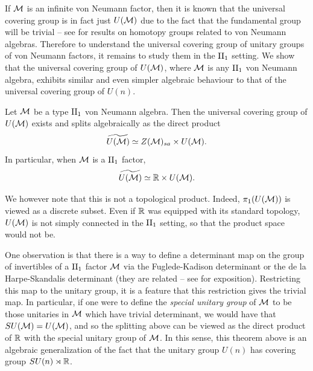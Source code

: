 \documentclass{amsart}
\begin{document}
  If $\mathcal{M}$ is an infinite von Neumann factor, then it is known that the universal covering group is in fact just $U(\mathcal{M})$ due to the fact that the fundamental group will be trivial -- see \cite{Kuiper65,Breuer70,ArakiSmithSmith71,BruningWillgerodt76,Handelman78,Schroder84,Schroder84real} for results on homotopy groups related to von Neumann algebras.
  Therefore to understand the universal covering group of unitary groups of von Neumann factors, it remains to study them in the $\text{II}_1$ setting.
  We show that the universal covering group of $U(\mathcal{M})$, where $\mathcal{M}$ is any $\text{II}_1$ von Neumann algebra, exhibits similar and even simpler algebraic behaviour to that of the universal covering group of $U(n)$.
  

\begin{result}
Let $\mathcal{M}$ be a type $\text{II}_1$ von Neumann algebra. Then the universal covering group of $U(\mathcal{M})$ exists and splits algebraically as the direct product
\begin{equation}
\widetilde{U(\mathcal{M})} \simeq Z(\mathcal{M})_{sa} \times U(\mathcal{M}).
\end{equation}
In particular, when $\mathcal{M}$ is a $\text{II}_1$ factor,
\begin{equation}
\widetilde{U(\mathcal{M})} \simeq \mathbb{R} \times U(\mathcal{M}).
\end{equation}
\end{result}

We however note that this is not a topological product. Indeed, $\pi_1(U(\mathcal{M}))$ is viewed as a discrete subset. Even if $\mathbb{R}$ was equipped with its standard topology, $U(\mathcal{M})$ is not simply connected in the $\text{II}_1$ setting, so that the product space would not be. 

One observation is that there is a way to define a determinant map on the group of invertibles of a $\text{II}_1$ factor $\mathcal{M}$ via the Fuglede-Kadison determinant \cite{FugledeKadison52} or the de la Harpe-Skandalis determinant \cite{dlHS84a} (they are related -- see \cite{dlHarpe13} for exposition).
Restricting this map to the unitary group, it is a feature that this restriction gives the trivial map.
In particular, if one were to define the \emph{special unitary group} of $\mathcal{M}$ to be those unitaries in $\mathcal{M}$ which have trivial determinant, we would have that $SU(\mathcal{M}) = U(\mathcal{M})$, and so the splitting above can be viewed as the direct product of $\mathbb{R}$ with the special unitary group of $\mathcal{M}$. 
In this sense, this theorem above is an algebraic generalization of the fact that the unitary group $U(n)$ has covering group $SU(n) \rtimes \mathbb{R}$. 
\end{document}
